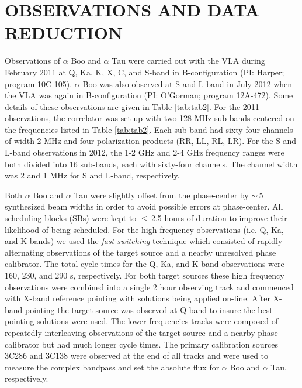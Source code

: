 \documentclass[iop]{emulateapj}
\begin{document}
\section{OBSERVATIONS AND DATA REDUCTION}

Observations of $\alpha$ Boo and $\alpha$ Tau were carried out with the VLA during February 2011 at Q, Ka, K, X, C, and S-band in B-configuration (PI: Harper; program 10C-105). $\alpha$ Boo was also observed at S and L-band in July 2012 when the VLA was again in B-configuration (PI: O'Gorman; program 12A-472). Some details of these observations are given in Table \ref{tab:tab2}. For the 2011 observations, the correlator was set up with two 128 MHz sub-bands centered on the frequencies listed in Table \ref{tab:tab2}. Each sub-band had sixty-four channels of width 2 MHz and four polarization products (RR, LL, RL, LR). For the S and L-band observations in 2012, the 1-2 GHz and 2-4 GHz frequency ranges were both divided into 16 sub-bands, each with sixty-four channels. The channel width was 2 and 1 MHz for S and L-band, respectively.

Both $\alpha$ Boo and $\alpha$ Tau were slightly offset from the phase-center by $\sim$\,5 synthesized beam widths in order to avoid possible errors at phase-center. All scheduling blocks (SBs) were kept to $\le$\,2.5 hours of duration to improve their likelihood of being scheduled. For the high frequency observations (i.e. Q, Ka, and K-bands) we used the \textit{fast switching} technique which consisted of rapidly alternating observations of the target source and a nearby unresolved phase calibrator. The total cycle times for the Q, Ka, and K-band observations were 160, 230, and 290 s, respectively. For both target sources these high frequency observations were combined into a single 2 hour observing track and commenced with X-band reference pointing with solutions being applied on-line. After X-band pointing the target source was observed at Q-band to insure the best pointing solutions were used. The lower frequencies tracks were composed of repeatedly interleaving observations of the target source and a nearby phase calibrator but had much longer cycle times. The primary calibration sources 3C286 and 3C138 were observed at the end of all tracks and were used to measure the complex bandpass and set the absolute flux for $\alpha$ Boo and $\alpha$ Tau, respectively.  
\end{document}
